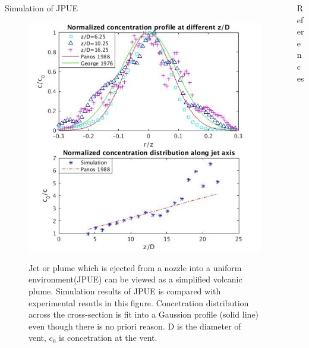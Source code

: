 \documentclass[final]{beamer}
\newlength{\onecolwid}
\newlength{\twocolwid}
\begin{document}
\begin{frame}[t]
\begin{columns}[t]
\begin{column}{\twocolwid}
\begin{columns}[t,totalwidth=\twocolwid]
\begin{column}{\onecolwid}
\begin{block}{Simulation of JPUE}
\begin{figure}
\centering
{\includegraphics[height= 0.690\linewidth]{jpue_conc}}
\caption{Jet or plume which is ejected from a nozzle into a uniform environment(JPUE) can be viewed as a simplified volcanic plume. Simulation results of JPUE is compared with experimental resutls \cite{papanicolaou1988investigations, george1977turbulence} in this figure. Concetration distribution across the cross-section is fit into a Gaussion profile (solid line) even though there is no priori reason. D is the diameter of vent, $c_0$ is concetration at the vent.}
\end{figure}

\end{block}

\end{column} %

\begin{column}{\onecolwid}\vspace{-1.4in} 
\begin{alertblock}{References}

\small{
}

\end{alertblock}



\end{column}
\end{columns}
\end{column}
\end{columns}
\end{frame}
\end{document}
